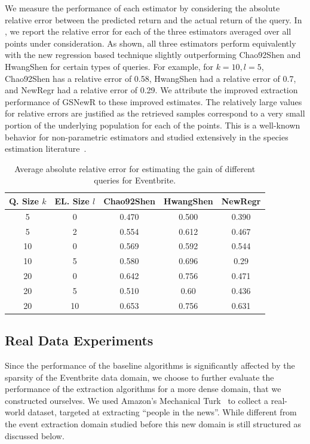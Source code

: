 We measure the performance of each estimator by considering the absolute relative error between the predicted return and the actual return of the query. In , we report the relative error for each of the three estimators averaged over all points under consideration. As shown, all three estimators perform equivalently with the new regression based technique slightly outperforming Chao92Shen and HwangShen for certain types of queries. For example, for $k = 10, l = 5$, Chao92Shen has a relative error of 0.58, HwangShen had a relative error of 0.7, and NewRegr had a relative error of 0.29. We attribute the improved extraction performance of GSNewR to these improved estimates. The relatively large values for relative errors are justified as the retrieved samples correspond to a very small portion of the underlying population for each of the points. This is a well-known behavior for non-parametric estimators and studied extensively in the species estimation literature~\cite{hwang:2010}. 

\begin{table}
\scriptsize\center
\caption{Average absolute relative error for estimating the gain of different queries for Eventbrite.}
\label{tab:eventesterror}
\begin{tabular}{|c|c|c|c|c|}
\hline
\textbf{Q. Size $k$} & \textbf{EL. Size $l$} & \textbf{Chao92Shen} & \textbf{HwangShen} & \textbf{NewRegr} \\ \hline
5 & 0 & 0.470 & 0.500 & 0.390 \\
5 & 2 & 0.554 & 0.612 & 0.467\\
10 & 0 & 0.569 & 0.592 & 0.544\\
10 & 5 & 0.580 & 0.696 & 0.29\\
20 & 0 & 0.642 & 0.756 &0.471\\
20 & 5 & 0.510 & 0.60 & 0.436 \\
20 & 10 & 0.653 & 0.756 & 0.631\\
\hline
\end{tabular}
\vspace{-10pt}
\end{table}

\subsection{Real Data Experiments}
\label{sec:realdata}
Since the performance of the baseline algorithms is significantly affected by the sparsity of the Eventbrite data domain, we choose to further evaluate the performance of the extraction algorithms for a more dense domain, that we constructed ourselves. We used Amazon's Mechanical Turk~\cite{mturk} to collect a real-world dataset, targeted at extracting ``people in the news''. While different from the event extraction domain studied before this new domain is still structured as discussed below.

